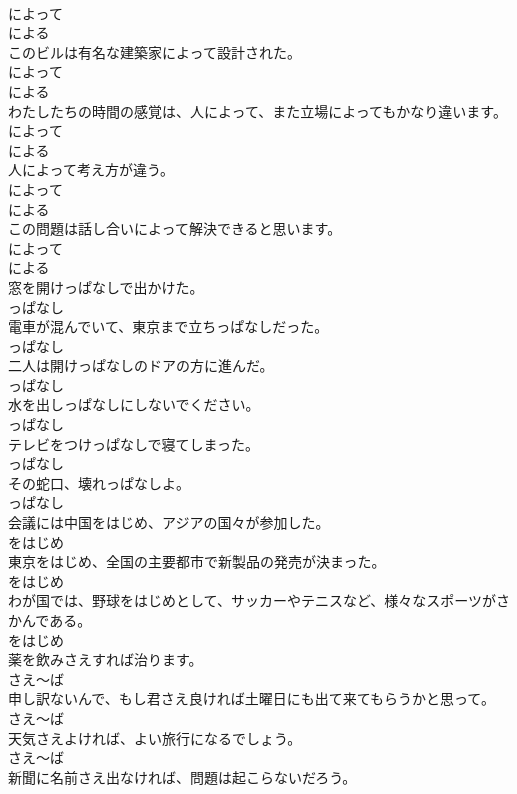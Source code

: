 \documentclass[8pt]{extreport}
\begin{document}
\begin{CJK}{UTF8}{min}
\\	によって 
\\	による	
\\	このビルは有名な建築家によって設計された。	
\\	によって 
\\	による	
\\	わたしたちの時間の感覚は、人によって、また立場によってもかなり違います。	
\\	によって 
\\	による	
\\	人によって考え方が違う。	
\\	によって 
\\	による	
\\	この問題は話し合いによって解決できると思います。	
\\	によって 
\\	による	
\\	窓を開けっぱなしで出かけた。	
\\	っぱなし	
\\	電車が混んでいて、東京まで立ちっぱなしだった。	
\\	っぱなし	
\\	二人は開けっぱなしのドアの方に進んだ。	
\\	っぱなし	
\\	水を出しっぱなしにしないでください。	
\\	っぱなし	
\\	テレビをつけっぱなしで寝てしまった。	
\\	っぱなし	
\\	その蛇口、壊れっぱなしよ。	
\\	っぱなし	
\\	会議には中国をはじめ、アジアの国々が参加した。	
\\	をはじめ	
\\	東京をはじめ、全国の主要都市で新製品の発売が決まった。	
\\	をはじめ	
\\	わが国では、野球をはじめとして、サッカーやテニスなど、様々なスポーツがさかんである。	
\\	をはじめ	
\\	薬を飲みさえすれば治ります。	
\\	さえ～ば	
\\	申し訳ないんで、もし君さえ良ければ土曜日にも出て来てもらうかと思って。	
\\	さえ～ば	
\\	天気さえよければ、よい旅行になるでしょう。	
\\	さえ～ば	
\\	新聞に名前さえ出なければ、問題は起こらないだろう。	

\end{CJK}
\end{document}
